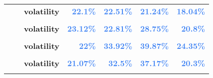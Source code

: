 \documentclass[
  authoryear,
  preprint,
  3p]{elsarticle}
\begin{document}
\begin{longtable}[t]{>{}l>{}l>{}l>{}r>{}r>{}r>{}r}
\addlinespace
\textbf{} & \textbf{} & \textbf{volatility} & \textcolor[HTML]{4285f4}{\textbf{22.1\%}} & \textcolor[HTML]{4285f4}{\textbf{22.51\%}} & \textcolor[HTML]{4285f4}{\textbf{21.24\%}} & \textcolor[HTML]{4285f4}{\textbf{18.04\%}}\\
\textbf{\cellcolor{gray!10}{}} & \textbf{\cellcolor{gray!10}{contango}} & \textbf{\cellcolor{gray!10}{mean}} & \textcolor[HTML]{4285f4}{\textbf{\cellcolor{gray!10}{-3.22\%}}} & \textcolor[HTML]{4285f4}{\textbf{\cellcolor{gray!10}{-3.81\%}}} & \textcolor[HTML]{4285f4}{\textbf{\cellcolor{gray!10}{8.04\%}}} & \textcolor[HTML]{4285f4}{\textbf{\cellcolor{gray!10}{-17.28\%}}}\\
\textbf{} & \textbf{} & \textbf{volatility} & \textcolor[HTML]{4285f4}{\textbf{23.12\%}} & \textcolor[HTML]{4285f4}{\textbf{22.81\%}} & \textcolor[HTML]{4285f4}{\textbf{28.75\%}} & \textcolor[HTML]{4285f4}{\textbf{20.8\%}}\\
\textbf{\cellcolor{gray!10}{Silver (XCEC)}} & \textbf{\cellcolor{gray!10}{whole period}} & \textbf{\cellcolor{gray!10}{mean}} & \textcolor[HTML]{4285f4}{\textbf{\cellcolor{gray!10}{6.19\%}}} & \textcolor[HTML]{4285f4}{\textbf{\cellcolor{gray!10}{17.54\%}}} & \textcolor[HTML]{4285f4}{\textbf{\cellcolor{gray!10}{21.96\%}}} & \textcolor[HTML]{4285f4}{\textbf{\cellcolor{gray!10}{-2.43\%}}}\\
\textbf{} & \textbf{} & \textbf{volatility} & \textcolor[HTML]{4285f4}{\textbf{22\%}} & \textcolor[HTML]{4285f4}{\textbf{33.92\%}} & \textcolor[HTML]{4285f4}{\textbf{39.87\%}} & \textcolor[HTML]{4285f4}{\textbf{24.35\%}}\\
\addlinespace
\textbf{\cellcolor{gray!10}{}} & \textbf{\cellcolor{gray!10}{backwardation}} & \textbf{\cellcolor{gray!10}{mean}} & \textcolor[HTML]{4285f4}{\textbf{\cellcolor{gray!10}{5.98\%}}} & \textcolor[HTML]{4285f4}{\textbf{\cellcolor{gray!10}{14.29\%}}} & \textcolor[HTML]{4285f4}{\textbf{\cellcolor{gray!10}{19.66\%}}} & \textcolor[HTML]{4285f4}{\textbf{\cellcolor{gray!10}{3.44\%}}}\\
\textbf{} & \textbf{} & \textbf{volatility} & \textcolor[HTML]{4285f4}{\textbf{21.07\%}} & \textcolor[HTML]{4285f4}{\textbf{32.5\%}} & \textcolor[HTML]{4285f4}{\textbf{37.17\%}} & \textcolor[HTML]{4285f4}{\textbf{20.3\%}}\\
\textbf{\cellcolor{gray!10}{}} & \textbf{\cellcolor{gray!10}{contango}} & \textbf{\cellcolor{gray!10}{mean}} & \textcolor[HTML]{4285f4}{\textbf{\cellcolor{gray!10}{6.57\%}}} & \textcolor[HTML]{4285f4}{\textbf{\cellcolor{gray!10}{20.83\%}}} & \textcolor[HTML]{4285f4}{\textbf{\cellcolor{gray!10}{26.77\%}}} & \textcolor[HTML]{4285f4}{\textbf{\cellcolor{gray!10}{-8.09\%}}}\\

\end{longtable}
\end{document}
